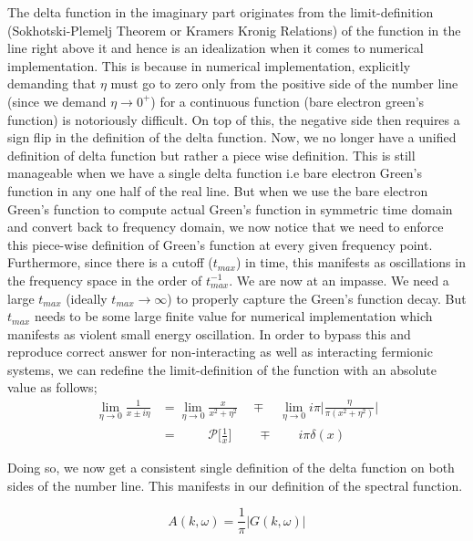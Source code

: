 \documentclass{article}
\begin{document}
The delta function in the imaginary part originates from the limit-definition (Sokhotski-Plemelj Theorem or Kramers Kronig Relations) of the function in the line right above it and hence is an idealization when it comes to numerical implementation. This is because in numerical implementation, explicitly demanding that $\eta$ must go to zero only from the positive side of the number line (since we demand $\eta\rightarrow0^+$) for a continuous function (bare electron green's function) is notoriously difficult. On top of this, the negative side then requires a sign flip in the definition of the delta function. Now, we no longer have a unified definition of delta function but rather a piece wise definition. This is still manageable when we have a single delta function i.e bare electron Green's function in any one half of the real line. But when we use the bare electron Green's function to compute actual Green's function in symmetric time domain and convert back to frequency domain, we now notice that we need to enforce this piece-wise definition of Green's function at every given frequency point. Furthermore, since there is a cutoff ($t_{max}$) in time, this manifests as oscillations in the frequency space in the order of $t^{-1}_{max}$. We are now at an impasse. We need a large $t_{max}$ (ideally $t_{max}\rightarrow \infty$) to properly capture the Green's function decay. But $t_{max}$ needs to be some large finite value for numerical implementation which manifests as violent small energy oscillation. In order to bypass this and reproduce correct answer for non-interacting as well as interacting fermionic systems, we can redefine the limit-definition of the function with an absolute value as follows;
\begin{equation}
\begin{aligned}
    \lim_{\eta\rightarrow 0} \frac{1}{x\pm i \eta} &=\lim_{\eta\rightarrow 0} \frac{x}{x^2+ \eta^2} \quad\mp\quad\lim_{\eta\rightarrow 0}  i\pi\Big| \frac{\eta}{\pi(x^2 + \eta^2)}\Big|\\
    & =\qquad \,\,\mathscr{P}\Big[\frac{1}{x} \Big] \qquad\mp\qquad i\pi\delta(x)
\end{aligned}
\end{equation}

Doing so, we now get a consistent single definition of the delta function on both sides of the number line. This manifests in our definition of the spectral function.

\begin{equation}
    A(k,\omega) = \frac{1}{\pi}|G(k,\omega)|
    \label{absolute}
\end{equation}
\end{document}
